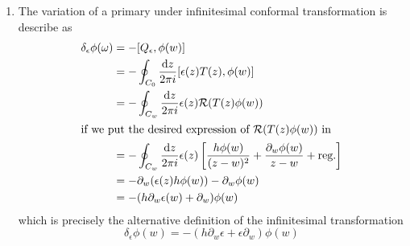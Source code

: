 \begin{enumerate}[label=(\alph*)]
	\item The variation of a primary under infinitesimal conformal transformation is describe as
		\begin{align*}
			\delta_\epsilon \phi (\omega) &= - \comm{Q_\epsilon}{\phi(w)}  \\
													&= - \oint_{C_0} \frac{\dd{z}}{2\pi i } \comm{\epsilon(z) T (z)}{\phi(w)} \\
													&= - \oint_{C_w} \frac{\dd{z}}{2\pi i} \epsilon(z) \mathcal{R} (T(z) \phi(w)) \\
													\shortintertext{if we put the desired expression of $\mathcal{R} (T(z) \phi(w))$ in}
													  &= -\oint_{C_w} \frac{\dd{z}}{2\pi i} \epsilon(z) \left[ \frac{h\phi(w)}{(z-w)^2} + \frac{\partial_w \phi(w)}{z-w} +\text{reg.} \right] \\
													  &= - \partial_w(\epsilon(z) h \phi(w)) - \partial_w \phi(w) \\
													  &= - (h \partial_w \epsilon(w)  + \partial_w) \phi(w)
		\end{align*}
		which is precisely the alternative definition of the infinitesimal transformation
		\begin{equation}
			\delta_\epsilon \phi(w) = - (h \partial_w \epsilon + \epsilon \partial_w) \phi(w)
		\end{equation}


\end{enumerate}
